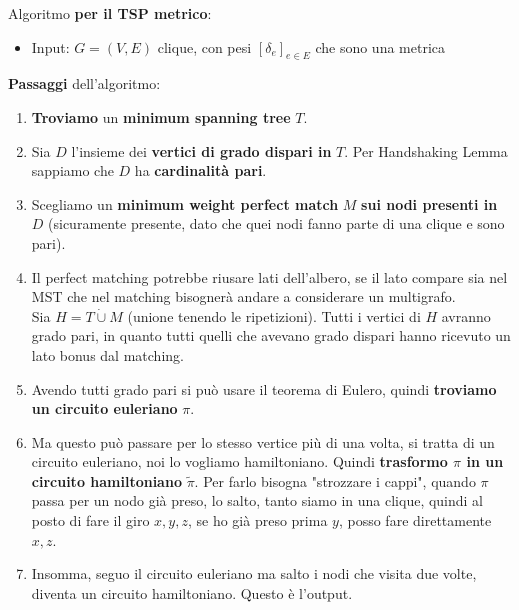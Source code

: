 \documentclass[11pt]{article}
\begin{document}
	Algoritmo \textbf{per il TSP metrico}:
	\begin{itemize}
		\item Input: $G = (V,E)$ clique, con pesi $[\delta_e]_{e \in E}$ che sono una metrica
	\end{itemize}
	
	\textbf{Passaggi} dell'algoritmo:
	\begin{enumerate}
		\item \textbf{Troviamo} un \textbf{minimum spanning tree} $T$.\\
		
		\item Sia $D$ l'insieme dei \textbf{vertici di grado dispari in} $T$. Per Handshaking Lemma sappiamo che $D$ ha \textbf{cardinalità pari}.\\
		
		\item Scegliamo un \textbf{minimum weight perfect match} $M$ \textbf{sui nodi presenti in} $D$ (sicuramente presente, dato che quei nodi fanno parte di una clique e sono pari). 
		
		\item Il perfect matching potrebbe riusare lati dell'albero, se il lato compare sia nel MST che nel matching bisognerà andare a considerare un multigrafo. \\
		Sia $H = T \dot{\cup} M$ (unione tenendo le ripetizioni). Tutti i vertici di $H$ avranno grado pari, in quanto tutti quelli che avevano grado dispari hanno ricevuto un lato bonus dal matching.\\
		
		\item Avendo tutti grado pari si può usare il teorema di Eulero, quindi \textbf{troviamo un circuito euleriano} $\pi$.\\
		
		\item Ma questo può passare per lo stesso vertice più di una volta, si tratta di un circuito euleriano, noi lo vogliamo hamiltoniano. Quindi \textbf{trasformo $\pi$ in un circuito hamiltoniano} $\tilde \pi$. Per farlo bisogna "strozzare i cappi", quando $\pi$ passa per un nodo già preso, lo salto, tanto siamo in una clique, quindi al posto di fare il giro $x, y, z$, se ho già preso prima $y$, posso fare direttamente $x,z$.\\
		
		\item Insomma, seguo il circuito euleriano ma salto i nodi che visita due volte, diventa un circuito hamiltoniano. Questo è l'output.\\
	\end{enumerate}
	
\end{document}
